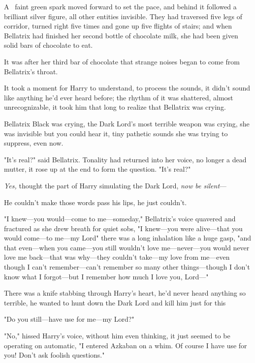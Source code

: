 
\lettrine{A}{~} faint green
spark moved forward to set the pace, and behind it followed a brilliant silver
figure, all other entities invisible. They had traversed five legs of corridor,
turned right five times and gone up five flights of stairs; and when Bellatrix
had finished her second bottle of chocolate milk, she had been given solid bars
of chocolate to eat.

It was after her third bar of chocolate that strange noises began to come from
Bellatrix's throat.

It took a moment for Harry to understand, to process the sounds, it didn't
sound like anything he'd ever heard before; the rhythm of it was shattered,
almost unrecognizable, it took him that long to realize that Bellatrix was
crying.

Bellatrix Black was crying, the Dark Lord's most terrible weapon was crying,
she was invisible but you could hear it, tiny pathetic sounds she was trying to
suppress, even now.

"It's real?" said Bellatrix. Tonality had returned into her voice, no longer a
dead mutter, it rose up at the end to form the question. "It's real?"

\emph{Yes,} thought the part of Harry simulating the Dark Lord, \emph{now be
silent}---

He couldn't make those words pass his lips, he just couldn't.

"I knew---you would---come to me---someday," Bellatrix's voice quavered and
fractured as she drew breath for quiet sobs, "I knew---you were alive---that
you would come---to me---my Lord{\el}" there was a long inhalation like a
huge gasp, "and that even---when you came---you still wouldn't love
me---never---you would never love me back---that was why---they couldn't
take---my love from me---even though I can't remember---can't remember so many
other things---though I don't know what I forgot---but I remember how much I
love you, Lord\mbox{---}"

There was a knife stabbing through Harry's heart, he'd never heard anything so
terrible, he wanted to hunt down the Dark Lord and kill him just for
this{\el}

"Do you still---have use for me---my Lord?"

"No," hissed Harry's voice, without him even thinking, it just seemed to be
operating on automatic, "I entered Azkaban on a whim. Of course I have use for
you! Don't ask foolish questions."

